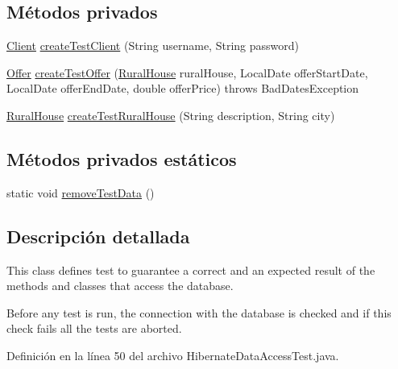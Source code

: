 \subsection*{Métodos privados}
\begin{DoxyCompactItemize}
\item 
\mbox{\hyperlink{classcom_1_1ruralhousejsf_1_1domain_1_1_client}{Client}} \mbox{\hyperlink{classcom_1_1ruralhousejsf_1_1_hibernate_data_access_test_a971c94d6c41317c2cc8de024153f0dc9}{create\+Test\+Client}} (String username, String password)
\item 
\mbox{\hyperlink{classcom_1_1ruralhousejsf_1_1domain_1_1_offer}{Offer}} \mbox{\hyperlink{classcom_1_1ruralhousejsf_1_1_hibernate_data_access_test_adb47ff6c8ba0fc7e7327407a8c937c4a}{create\+Test\+Offer}} (\mbox{\hyperlink{classcom_1_1ruralhousejsf_1_1domain_1_1_rural_house}{Rural\+House}} rural\+House, Local\+Date offer\+Start\+Date, Local\+Date offer\+End\+Date, double offer\+Price)  throws Bad\+Dates\+Exception 
\item 
\mbox{\hyperlink{classcom_1_1ruralhousejsf_1_1domain_1_1_rural_house}{Rural\+House}} \mbox{\hyperlink{classcom_1_1ruralhousejsf_1_1_hibernate_data_access_test_a455296993315fc3b33f1c5806622ad32}{create\+Test\+Rural\+House}} (String description, String city)
\end{DoxyCompactItemize}
\subsection*{Métodos privados estáticos}
\begin{DoxyCompactItemize}
\item 
static void \mbox{\hyperlink{classcom_1_1ruralhousejsf_1_1_hibernate_data_access_test_a71fef61bb66234d92d84ddd795de842a}{remove\+Test\+Data}} ()
\end{DoxyCompactItemize}


\subsection{Descripción detallada}
This class defines test to guarantee a correct and an expected result of the methods and classes that access the database. 

Before any test is run, the connection with the database is checked and if this check fails all the tests are aborted. 

Definición en la línea 50 del archivo Hibernate\+Data\+Access\+Test.\+java.



